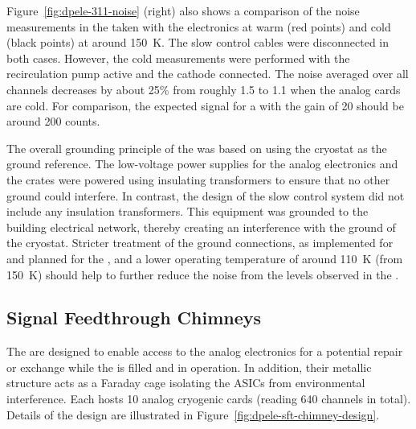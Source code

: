 Figure~\ref{fig:dpele-311-noise} (right) also shows a comparison of the noise measurements in the  taken with the  electronics at warm (red points) and cold (black points) at around \SI{150}{\kelvin}. The slow control cables were disconnected in both cases. However, the cold measurements were performed with the recirculation pump active and the cathode  connected. 
The \rms noise averaged over all channels decreases by about 25\% from roughly \SI{1.5}{} to \SI{1.1}{} when the  analog cards are cold. For comparison, the expected signal for a  with the  gain of \num{20} should be around \SI{200}{} counts. %

The overall grounding principle of the  was based on %
using the cryostat as the ground reference. The low-voltage power supplies for the  analog electronics and the  crates were powered %
using insulating transformers to ensure that %
no other ground could interfere. %
In contrast, the design of the slow control system did not include any insulation transformers. This equipment was grounded to the building electrical network, thereby creating an interference with the ground of the cryostat. Stricter treatment of the ground connections, as %
implemented for  and planned for the , and a lower  operating temperature of around \SI{110}{\kelvin} (from \SI{150}{\kelvin}) should help to further reduce the noise %
from the levels observed in the .


\subsection{Signal Feedthrough Chimneys}
\label{sec:fddp-tpc-elec-design-sft}

The  are designed to enable access to the  analog electronics for a potential repair or exchange while the  is filled and in operation. %
In addition, their metallic structure acts as a Faraday cage isolating the  ASICs from environmental interference.  Each  hosts \num{10} analog cryogenic  cards (reading \num{640} channels in total).  %
Details of the design are illustrated in Figure~\ref{fig:dpele-sft-chimney-design}. 

